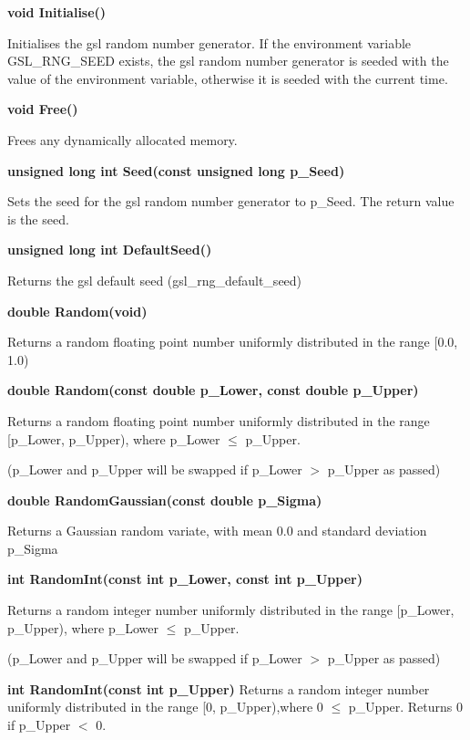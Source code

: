 \hfill
\begin{minipage}{\dimexpr\textwidth-3em}
    \bigskip\textbf{void Initialise()}

    Initialises the gsl random number generator.  If the environment variable GSL\_RNG\_SEED exists, the gsl random number generator is seeded with the value of the environment variable, otherwise it is seeded with the current time.

    \bigskip\textbf{void Free()}

    Frees any dynamically allocated memory.

    \bigskip\textbf{unsigned long int Seed(const unsigned long p\_Seed)}

    Sets the seed for the gsl random number generator to p\_Seed.  The return value is the seed.

    \bigskip\textbf{unsigned long int DefaultSeed()}

    Returns the gsl default seed (gsl\_rng\_default\_seed)

    \bigskip\textbf{double Random(void)}

    Returns a random floating point number uniformly distributed in the range [0.0, 1.0)

    \bigskip\textbf{double Random(const double p\_Lower, const double p\_Upper)}

    Returns a random floating point number uniformly distributed in the range [p\_Lower, p\_Upper), where p\_Lower $\leq$ p\_Upper.

    (p\_Lower and p\_Upper will be swapped if p\_Lower $\mathrm{>}$ p\_Upper as passed)
\end{minipage}

\hfill
\begin{minipage}{\dimexpr\textwidth-3em}
    \bigskip\textbf{double RandomGaussian(const double p\_Sigma)}

    Returns a Gaussian random variate, with mean 0.0 and standard deviation p\_Sigma

    \bigskip\textbf{int RandomInt(const int p\_Lower, const int p\_Upper)}

    Returns a random integer number uniformly distributed in the range [p\_Lower, p\_Upper), where p\_Lower $\leq$ p\_Upper.

    (p\_Lower and p\_Upper will be swapped if p\_Lower $>$ p\_Upper as passed)

    \bigskip\textbf{int RandomInt(const int p\_Upper)}
    Returns a random integer number uniformly distributed in the range [0, p\_Upper),where 0 $\leq$ p\_Upper.  Returns 0 if p\_Upper $<$ 0.
\end{minipage}